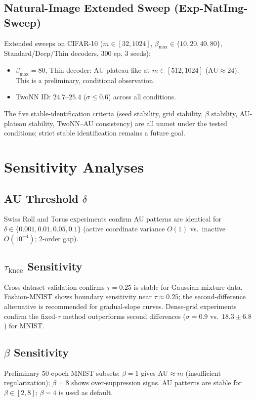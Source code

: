 \documentclass[make,article,submit,pdftex,moreauthors]{Definitions/mdpi}
\begin{document}
\subsection{Natural-Image Extended Sweep (Exp-NatImg-Sweep)}

Extended sweeps on CIFAR-10 ($m\in[32,1024]$, $\beta_{\max}\in\{10,20,40,80\}$,
Standard/Deep/Thin decoders, 300 ep, 3 seeds):
\begin{itemize}
\item $\beta_{\max}=80$, Thin decoder: AU plateau-like at $m\in[512,1024]$
  (AU$\approx24$). This is a preliminary, conditional observation.
\item TwoNN ID: $24.7$--$25.4$ ($\sigma\leq0.6$) across all conditions.
\end{itemize}
The five stable-identification criteria (seed stability, grid stability,
$\beta$ stability, AU-plateau stability, TwoNN--AU consistency) are all unmet
under the tested conditions; strict stable identification remains a future goal.

\section{Sensitivity Analyses}\label{app:sensitivity}

\subsection{AU Threshold $\delta$}\label{app:delta}
Swiss Roll and Torus experiments confirm AU patterns are identical for
$\delta\in\{0.001,0.01,0.05,0.1\}$ (active coordinate variance $O(1)$
vs.\ inactive $O(10^{-4})$; 2-order gap).

\subsection{\texorpdfstring{$\tau_{\mathrm{knee}}$ Sensitivity}{tau-knee Sensitivity}}\label{app:tau_knee}

Cross-dataset validation confirms $\tau=0.25$ is stable for Gaussian
mixture data.  Fashion-MNIST shows boundary sensitivity near $\tau\approx0.25$;
the second-difference alternative is recommended for gradual-slope curves.
Dense-grid experiments confirm the fixed-$\tau$ method outperforms second
differences ($\sigma=0.9$ vs.\ $18.3\pm6.8$) for MNIST.

\subsection{\texorpdfstring{$\beta$ Sensitivity}{beta Sensitivity}}\label{app:beta}
Preliminary 50-epoch MNIST subsets: $\beta=1$ gives AU$\approx m$
(insufficient regularization); $\beta=8$ shows over-suppression signs.
AU patterns are stable for $\beta\in[2,8]$; $\beta=4$ is used as default.
\end{document}
